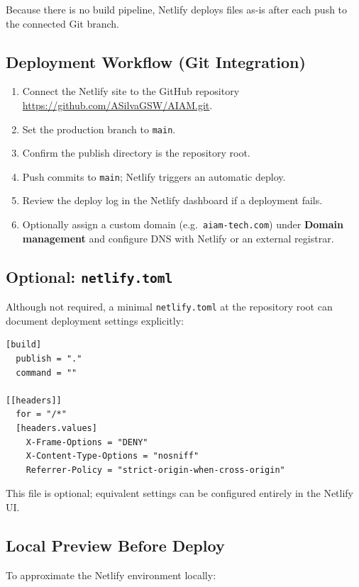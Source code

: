 \documentclass[11pt,a4paper]{article}
\begin{document}
Because there is no build pipeline, Netlify deploys files as-is after each
push to the connected Git branch.

\subsection{Deployment Workflow (Git Integration)}

\begin{enumerate}
  \item Connect the Netlify site to the GitHub repository
        \url{https://github.com/ASilvaGSW/AIAM.git}.
  \item Set the production branch to \texttt{main}.
  \item Confirm the publish directory is the repository root.
  \item Push commits to \texttt{main}; Netlify triggers an automatic deploy.
  \item Review the deploy log in the Netlify dashboard if a deployment fails.
  \item Optionally assign a custom domain (e.g.\ \texttt{aiam-tech.com}) under
        \textbf{Domain management} and configure DNS with Netlify or an external
        registrar.
\end{enumerate}

\subsection{Optional: \texttt{netlify.toml}}

Although not required, a minimal \texttt{netlify.toml} at the repository root
can document deployment settings explicitly:

\begin{lstlisting}
[build]
  publish = "."
  command = ""

[[headers]]
  for = "/*"
  [headers.values]
    X-Frame-Options = "DENY"
    X-Content-Type-Options = "nosniff"
    Referrer-Policy = "strict-origin-when-cross-origin"
\end{lstlisting}

This file is optional; equivalent settings can be configured entirely in the
Netlify UI.

\subsection{Local Preview Before Deploy}

To approximate the Netlify environment locally:
\end{document}
